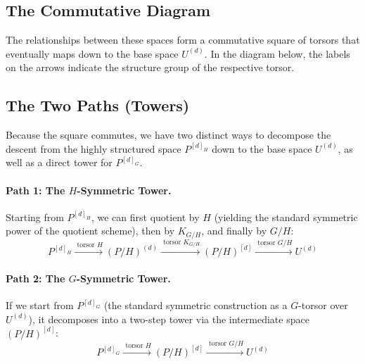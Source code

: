 \subsection*{The Commutative Diagram}

The relationships between these spaces form a commutative square of torsors that eventually maps down to the base space $U^{(d)}$. In the diagram below, the labels on the arrows indicate the structure group of the respective torsor.

\vspace{1em}
\begin{center}
\end{center}
\vspace{1em}

\subsection*{The Two Paths (Towers)}

Because the square commutes, we have two distinct ways to decompose the descent from the highly structured space $P^{[d]_H}$ down to the base space $U^{(d)}$, as well as a direct tower for $P^{[d]_G}$.

\paragraph{Path 1: The $H$-Symmetric Tower.} 
Starting from $P^{[d]_H}$, we can first quotient by $H$ (yielding the standard symmetric power of the quotient scheme), then by $K_{G/H}$, and finally by $G/H$:
\[
P^{[d]_H} \xrightarrow{\text{ torsor } H} (P/H)^{(d)} \xrightarrow{\text{ torsor } K_{G/H}} (P/H)^{[d]} \xrightarrow{\text{ torsor } G/H} U^{(d)}
\]

\paragraph{Path 2: The $G$-Symmetric Tower.}
If we start from $P^{[d]_G}$ (the standard symmetric construction as a $G$-torsor over $U^{(d)}$), it decomposes into a two-step tower via the intermediate space $(P/H)^{[d]}$:
\[
P^{[d]_G} \xrightarrow{\text{ torsor } H} (P/H)^{[d]} \xrightarrow{\text{ torsor } G/H} U^{(d)}
\]


